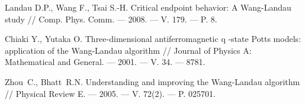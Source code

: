 \begin{thebibliography}{111}
Landau D.P., Wang F., Tsai S.-H.
Critical endpoint behavior: A Wang-Landau study
//
Comp. Phys. Comm.
--- 2008.
--- V. 179.
--- P. 8.

Chiaki Y., Yutaka O.
Three-dimensional antiferromagnetic q -state Potts models: application of the Wang-Landau algorithm
//
Journal of Physics A: Mathematical and General.
--- 2001.
--- V. 34.
--- 8781.

Zhou~C., Bhatt~R.N. 
Understanding and improving the Wang-Landau algorithm 
//
Physical Review E.
--- 2005.
--- V. 72(2).
--- P. 025701.





\end{thebibliography} 